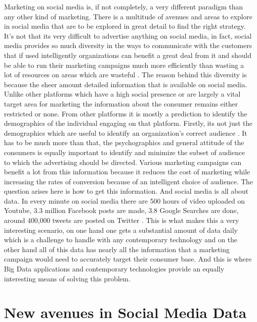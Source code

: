 \documentclass[sigconf]{acmart}
\begin{document}
Marketing on social media is, if not completely, a very different paradigm than any other kind of marketing. There is a multitude of avenues and areas to explore in social media that are to be explored in great detail to find the right strategy. It's not that its very difficult to advertise anything on social media, in fact, social media provides so much diversity in the ways to communicate with the customers that if used intelligently organizations can benefit a great deal from it and should be able to run their marketing campaigns much more efficiently than wasting a lot of resources on areas which are wasteful \cite{holly}. The reason behind this diversity is because the sheer amount detailed information that is available on social media. Unlike other platforms which have a high social presence or are largely a vital target area for marketing the information about the consumer remains either restricted or none. From other platforms it is mostly a prediction to identify the demographics of the individual engaging on that platform. Firstly, its not just the demographics which are useful to identify an organization's correct audience \cite{alexendras}. It has to be much more than that, the psychographics and general attitude of the consumers is equally important to identify and minimize the subset of audience to which the advertising should be directed. Various marketing campaigns can benefit a lot from this information because it reduces the cost of marketing while increasing the rates of conversion because of an intelligent choice of audience. The question arises here is how to get this information. And social media is all about data. In every minute on social media there are 500 hours of video uploaded on Youtube, 3.3 million Facebook posts are made, 3.8 Google Searches are done, around 400,000 tweets are posted on Twitter \cite{roberta}. This is what makes this a very interesting scenario, on one hand one gets a substantial amount of data daily which is a challenge to handle with any contemporary technology and on the other hand all of this data has nearly all the information that a marketing campaign would need to accurately target their consumer base. And this is where Big Data applications and contemporary technologies provide an equally interesting means of solving this problem.

\section{New avenues in Social Media Data}
\end{document}
